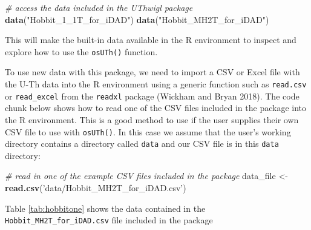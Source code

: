 \documentclass[]{elsarticle} %
\newenvironment{Shaded}{\begin{snugshade}}{\end{snugshade}}
\newcommand{\CommentTok}[1]{\textcolor[rgb]{0.56,0.35,0.01}{\textit{#1}}}
\newcommand{\KeywordTok}[1]{\textcolor[rgb]{0.13,0.29,0.53}{\textbf{#1}}}
\newcommand{\NormalTok}[1]{#1}
\newcommand{\StringTok}[1]{\textcolor[rgb]{0.31,0.60,0.02}{#1}}
\begin{document}
\begin{Shaded}
\begin{Highlighting}[]
\CommentTok{# access the data included in the UThwigl package}
\KeywordTok{data}\NormalTok{(}\StringTok{"Hobbit_1_1T_for_iDAD"}\NormalTok{)}
\KeywordTok{data}\NormalTok{(}\StringTok{"Hobbit_MH2T_for_iDAD"}\NormalTok{)}
\end{Highlighting}
\end{Shaded}

This will make the built-in data available in the R environment to inspect and explore how to use the \texttt{osUTh()} function.

To use new data with this package, we need to import a CSV or Excel file with the U-Th data into the R environment using a generic function such as \texttt{read.csv} or \texttt{read\_excel} from the \texttt{readxl} package (Wickham and Bryan 2018). The code chunk below shows how to read one of the CSV files included in the package into the R environment. This is a good method to use if the user supplies their own CSV file to use with \texttt{osUTh()}. In this case we assume that the user's working directory contains a directory called \texttt{data} and our CSV file is in this \texttt{data} directory:

\begin{Shaded}
\begin{Highlighting}[]
\CommentTok{# read in one of the example CSV files included in the package}
\NormalTok{data_file <-}
\StringTok{  }\KeywordTok{read.csv}\NormalTok{(}\StringTok{'data/Hobbit_MH2T_for_iDAD.csv'}\NormalTok{)}
\end{Highlighting}
\end{Shaded}

\newpage

Table \ref{tab:hobbitone} shows the data contained in the \texttt{Hobbit\_MH2T\_for\_iDAD.csv} file included in the package
\end{document}

